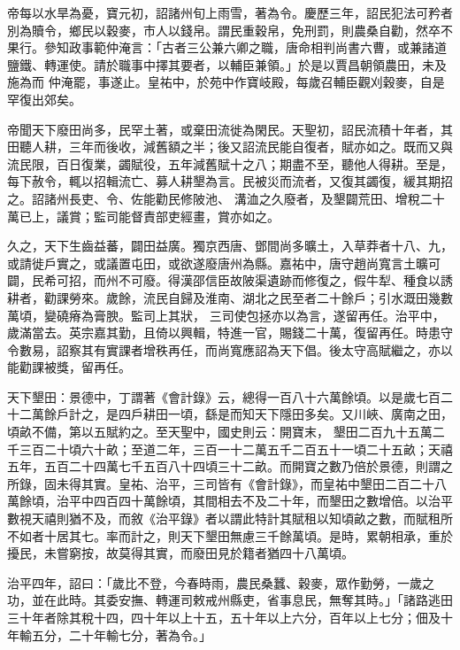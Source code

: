 \begin{pinyinscope}
 帝每以水旱為憂，寶元初，詔諸州旬上雨雪，著為令。慶歷三年，詔民犯法可矜者別為贖令，鄉民以穀麥，市人以錢帛。謂民重穀帛，免刑罰，則農桑自勸，然卒不果行。參知政事範仲淹言：「古者三公兼六卿之職，唐命相判尚書六曹，或兼諸道鹽鐵、轉運使。請於職事中擇其要者，以輔臣兼領。」於是以賈昌朝領農田，未及施為而
 仲淹罷，事遂止。皇祐中，於苑中作寶岐殿，每歲召輔臣觀刈穀麥，自是罕復出郊矣。



 帝聞天下廢田尚多，民罕土著，或棄田流徙為閑民。天聖初，詔民流積十年者，其田聽人耕，三年而後收，減舊額之半；後又詔流民能自復者，賦亦如之。既而又與流民限，百日復業，蠲賦役，五年減舊賦十之八；期盡不至，聽他人得耕。至是，每下赦令，輒以招輯流亡、募人耕墾為言。民被災而流者，又復其蠲復，緩其期招之。詔諸州長吏、令、佐能勸民修陂池、
 溝洫之久廢者，及墾闢荒田、增稅二十萬已上，議賞；監司能督責部吏經畫，賞亦如之。



 久之，天下生齒益蕃，闢田益廣。獨京西唐、鄧間尚多曠土，入草莽者十八、九，或請徙戶實之，或議置屯田，或欲遂廢唐州為縣。嘉祐中，唐守趙尚寬言土曠可闢，民希可招，而州不可廢。得漢邵信臣故陂渠遺跡而修復之，假牛犁、種食以誘耕者，勸課勞來。歲餘，流民自歸及淮南、湖北之民至者二十餘戶；引水溉田幾數萬頃，變磽瘠為膏腴。監司上其狀，
 三司使包拯亦以為言，遂留再任。治平中，歲滿當去。英宗嘉其勤，且倚以興輯，特進一官，賜錢二十萬，復留再任。時患守令數易，詔察其有實課者增秩再任，而尚寬應詔為天下倡。後太守高賦繼之，亦以能勸課被獎，留再任。



 天下墾田：景德中，丁謂著《會計錄》云，總得一百八十六萬餘頃。以是歲七百二十二萬餘戶計之，是四戶耕田一頃，繇是而知天下隱田多矣。又川峽、廣南之田，頃畝不備，第以五賦約之。至天聖中，國史則云：開寶末，
 墾田二百九十五萬二千三百二十頃六十畝；至道二年，三百一十二萬五千二百五十一頃二十五畝；天禧五年，五百二十四萬七千五百八十四頃三十二畝。而開寶之數乃倍於景德，則謂之所錄，固未得其實。皇祐、治平，三司皆有《會計錄》，而皇祐中墾田二百二十八萬餘頃，治平中四百四十萬餘頃，其間相去不及二十年，而墾田之數增倍。以治平數視天禧則猶不及，而敘《治平錄》者以謂此特計其賦租以知頃畝之數，而賦租所
 不如者十居其七。率而計之，則天下墾田無慮三千餘萬頃。是時，累朝相承，重於擾民，未嘗窮按，故莫得其實，而廢田見於籍者猶四十八萬頃。



 治平四年，詔曰：「歲比不登，今春時雨，農民桑蠶、穀麥，眾作勤勞，一歲之功，並在此時。其委安撫、轉運司敕戒州縣吏，省事息民，無奪其時。」「諸路逃田三十年者除其稅十四，四十年以上十五，五十年以上六分，百年以上七分；佃及十年輸五分，二十年輸七分，著為令。」




\end{pinyinscope}
